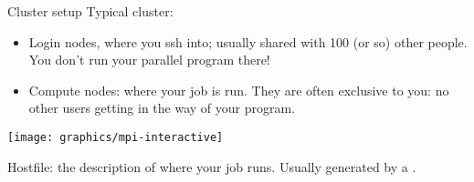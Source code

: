 \begin{frame}{Cluster setup}
  \small
  Typical cluster:
  \begin{itemize}
  \item Login nodes, where you ssh into; usually shared with 100 (or
    so) other people. You don't run your parallel program there!
  \item Compute nodes: where your job is run. They are often exclusive
    to you: no other users getting in the way of your program.
  \end{itemize}
  \texttt{[image: graphics/mpi-interactive]}

  Hostfile: the description of where your job runs. Usually generated
  by a .
\end{frame}

\begin{comment}
  \begin{tacc}
    \begin{frame}[containsverbatim]{Lab setup}
      \textbf{Official version}:\\
      Open two windows on stampede.
      \begin{itemize}
      \item In one window you will be editing and compiling;
      \item in the other, type \n{idev -N 2 -n 32 -t 4:0:0 } which gives
        you an interactive session of 2~nodes, 32~cores, for the next
        4~hours.
      \end{itemize}
      The C compiler is \texttt{mpicc}, C++ is \texttt{mpicxx}, Fortran is
      \texttt{mpif90}. To run (on a compute node!) type \texttt{ibrun
        yourprog}.

      No hostfiles or process count needed!

      \textbf{Shortcut for training}:\\ issue \n{idev} command, then \n{source
        ~train00/tacc_hpc_sourceme} in idev session.
    \end{frame}
  \end{tacc}
\end{comment}

